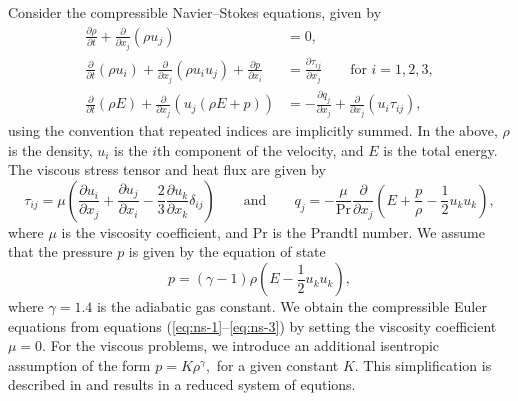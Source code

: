\documentclass[review]{siamart}
\begin{document}
Consider the compressible Navier--Stokes equations, given by
\begin{align}
    \label{eq:ns-1}
	 \frac{\partial\rho}{\partial t} + \frac{\partial}{\partial x_j}(\rho u_j)
	 	&= 0, \\
    \label{eq:ns-2}
    \frac{\partial}{\partial t}(\rho u_i) + \frac{\partial}{\partial x_j} (\rho u_i u_j) + \frac{\partial p}{\partial x_i}
      &= \frac{\partial \tau_{ij}}{\partial x_j} \qquad \text{for $i=1,2,3,$}\\
    \label{eq:ns-3}
	 \frac{\partial}{\partial t}(\rho E) + \frac{\partial}{\partial x_j} \left(u_j(\rho E + p) \right)
	 	&= -\frac{\partial q_j}{\partial x_j} + \frac{\partial}{\partial x_j} (u_i \tau_{ij}),
\end{align}
using the convention that repeated indices are implicitly summed.
In the above, $\rho$ is the density, $u_i$ is the $i$th component of the velocity, and $E$ is the total energy.
The viscous stress tensor and heat flux are given by
\begin{equation}
	\tau_{ij} = \mu\left(
		\frac{\partial u_i}{\partial x_j} + \frac{\partial u_j}{\partial x_i}
		- \frac{2}{3} \frac{\partial u_k}{\partial x_k}  \delta_{ij}
	\right)
	\qquad\text{and}\qquad
	q_j = - \frac{\mu}{\mathrm{Pr}} \frac{\partial}{\partial x_j} \left(E + \frac{p}{\rho} - \frac{1}{2} u_k u_k \right),
\end{equation}
where $\mu$ is the viscosity coefficient, and $\mathrm{Pr}$ is the Prandtl number.
We assume that the pressure $p$ is given by the equation of state
\begin{equation} \label{eq:eos}
    p = (\gamma - 1)\rho \left( E - \frac{1}{2} u_k u_k \right),
\end{equation}
where $\gamma = 1.4$ is the adiabatic gas constant.
We obtain the compressible Euler equations from equations (\ref{eq:ns-1}--\ref{eq:ns-3}) by setting the viscosity coefficient $\mu = 0$.
For the viscous problems, we introduce an additional isentropic assumption of the form $p = K \rho^\gamma,$ for a given constant $K$.
This simplification is described in \cite{Kanner2015} and results in a reduced system of equtions.
\end{document}
